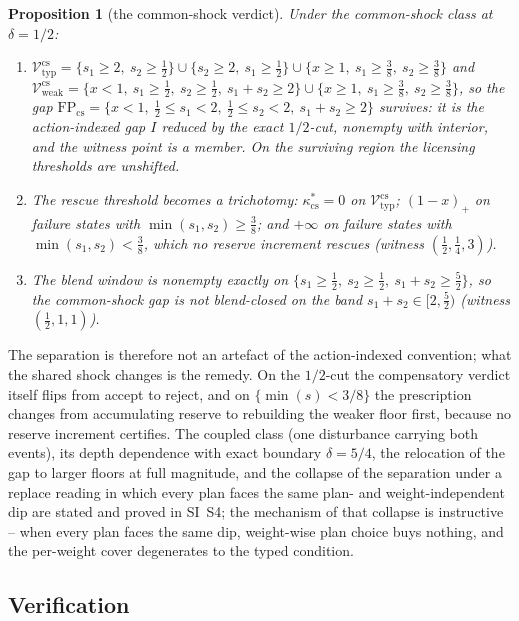 \documentclass[preprint,11pt,authoryear]{elsarticle}
\newtheorem{proposition}{Proposition}
\theoremstyle{definition}
\theoremstyle{remark}
\newcommand{\Vtyp}{\mathcal{V}_{\mathrm{typ}}}
\newcommand{\Vweak}{\mathcal{V}_{\mathrm{weak}}}
\begin{document}
\begin{proposition}[the common-shock verdict]\label{prop:commonshock}
Under the common-shock class at $\delta=1/2$:
\begin{enumerate}[label=\textup{(\roman*)},leftmargin=2em]
\item $\Vtyp^{\mathrm{cs}}=\{s_1\ge2,\ s_2\ge\tfrac12\}\cup\{s_2\ge2,\ s_1\ge\tfrac12\}\cup\{x\ge1,\ s_1\ge\tfrac38,\ s_2\ge\tfrac38\}$ and
$\Vweak^{\mathrm{cs}}=\{x<1,\ s_1\ge\tfrac12,\ s_2\ge\tfrac12,\ s_1+s_2\ge2\}\cup\{x\ge1,\ s_1\ge\tfrac38,\ s_2\ge\tfrac38\}$, so the gap
$\mathrm{FP}_{\mathrm{cs}}=\{x<1,\ \tfrac12\le s_1<2,\ \tfrac12\le s_2<2,\ s_1+s_2\ge2\}$
survives: it is the action-indexed gap $I$ reduced by the exact $1/2$-cut, nonempty with interior, and the witness point is a member. On the surviving region the licensing thresholds are unshifted.
\item The rescue threshold becomes a trichotomy: $\kappa^*_{\mathrm{cs}}=0$ on $\Vtyp^{\mathrm{cs}}$; $(1-x)_+$ on failure states with $\min(s_1,s_2)\ge\tfrac38$; and $+\infty$ on failure states with $\min(s_1,s_2)<\tfrac38$, which no reserve increment rescues (witness $(\tfrac12,\tfrac14,3)$).
\item The blend window is nonempty exactly on $\{s_1\ge\tfrac12,\ s_2\ge\tfrac12,\ s_1+s_2\ge\tfrac52\}$, so the common-shock gap is not blend-closed on the band $s_1+s_2\in[2,\tfrac52)$ (witness $(\tfrac12,1,1)$).
\end{enumerate}
\end{proposition}

The separation is therefore not an artefact of the action-indexed convention; what the shared shock changes is the remedy. On the $1/2$-cut the compensatory verdict itself flips from accept to reject, and on $\{\min(s)<3/8\}$ the prescription changes from accumulating reserve to rebuilding the weaker floor first, because no reserve increment certifies. The coupled class (one disturbance carrying both events), its depth dependence with exact boundary $\delta=5/4$, the relocation of the gap to larger floors at full magnitude, and the collapse of the separation under a replace reading in which every plan faces the same plan- and weight-independent dip are stated and proved in SI~S4; the mechanism of that collapse is instructive -- when every plan faces the same dip, weight-wise plan choice buys nothing, and the per-weight cover degenerates to the typed condition.

\subsection{Verification}\label{sec:verification}
\end{document}
